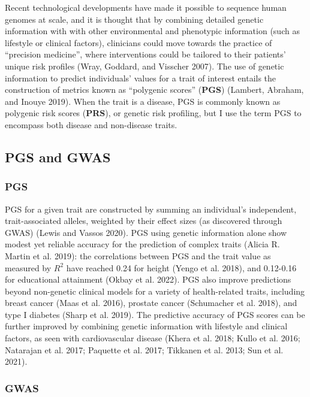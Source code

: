 \documentclass[
]{book}
\begin{document}
Recent technological developments have made it possible to sequence human genomes at scale, and it is thought that by combining detailed genetic information with with other environmental and phenotypic information (such as lifestyle or clinical factors), clinicians could move towards the practice of ``precision medicine'', where interventions could be tailored to their patients' unique risk profiles (Wray, Goddard, and Visscher 2007). The use of genetic information to predict individuals' values for a trait of interest entails the construction of metrics known as ``polygenic scores'' (\textbf{PGS}) (Lambert, Abraham, and Inouye 2019). When the trait is a disease, PGS is commonly known as polygenic risk scores (\textbf{PRS}), or genetic risk profiling, but I use the term PGS to encompass both disease and non-disease traits.

\hypertarget{pgs-intro}{%
\subsection{PGS and GWAS}\label{pgs-intro}}

\hypertarget{pgs}{%
\subsubsection{PGS}\label{pgs}}

PGS for a given trait are constructed by summing an individual's independent, trait-associated alleles, weighted by their effect sizes (as discovered through GWAS) (Lewis and Vassos 2020). PGS using genetic information alone show modest yet reliable accuracy for the prediction of complex traits (Alicia R. Martin et al. 2019): the correlations between PGS and the trait value as measured by \(R^2\) have reached 0.24 for height (Yengo et al. 2018), and 0.12-0.16 for educational attainment (Okbay et al. 2022). PGS also improve predictions beyond non-genetic clinical models for a variety of health-related traits, including breast cancer (Maas et al. 2016), prostate cancer (Schumacher et al. 2018), and type I diabetes (Sharp et al. 2019). The predictive accuracy of PGS scores can be further improved by combining genetic information with lifestyle and clinical factors, as seen with cardiovascular disease (Khera et al. 2018; Kullo et al. 2016; Natarajan et al. 2017; Paquette et al. 2017; Tikkanen et al. 2013; Sun et al. 2021).

\hypertarget{gwas}{%
\subsubsection{GWAS}\label{gwas}}
\end{document}

